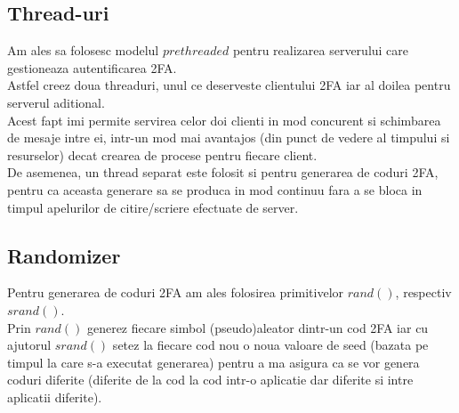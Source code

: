 \documentclass{article}
\begin{document}
	\subsection{Thread-uri}
	Am ales sa folosesc modelul $prethreaded$ pentru realizarea serverului care gestioneaza autentificarea 2FA. \\
	Astfel creez doua threaduri, unul ce deserveste clientului 2FA iar al doilea pentru serverul aditional. \\
	Acest fapt imi permite servirea celor doi clienti in mod concurent si schimbarea de mesaje intre ei, intr-un mod mai avantajos (din punct de vedere al timpului si resurselor) decat crearea de procese pentru fiecare client. \\
	De asemenea, un thread separat este folosit si pentru generarea de coduri 2FA, pentru ca aceasta generare sa se produca in mod continuu fara a se bloca in timpul apelurilor de citire/scriere efectuate de server.
	
	\subsection{Randomizer}
	Pentru generarea de coduri 2FA am ales folosirea primitivelor $rand()$, respectiv $srand()$. \\
	Prin $rand()$ generez fiecare simbol (pseudo)aleator dintr-un cod 2FA iar cu ajutorul $srand()$ setez la fiecare cod nou o noua valoare de seed (bazata pe timpul la care s-a executat generarea) pentru a ma asigura ca se vor genera coduri diferite (diferite de la cod la cod intr-o aplicatie dar diferite si intre aplicatii diferite).
	
\end{document}
